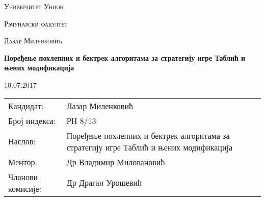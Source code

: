 \documentclass[a4paper, 12pt, ngerman]{article}
\newcommand{\DocumentTitle}{Поређење похлепних и бектрек алгоритама за стратегију игре Таблић и њених модификација}
\begin{document}
\renewcommand{\contentsname}{Садржај}
\renewcommand{\refname}{Литература}
\renewcommand{\abstractname}{Апстракт}
\renewcommand{\figurename}{Слика}
\renewcommand{\appendixtocname}{Додаци}
\renewcommand{\lstlistingname}{Фајл}
\renewcommand{\tablename}{Табела}
\renewcommand{\proofname}{Доказ}

\makeatletter
\renewcommand{\ALG@name}{Алгоритам}
\makeatother

\begin{titlepage}
	\centering
	{\scshape\Large Универзитет Унион \par}
	\vspace{1cm}
	{\scshape\LARGE Рачунарски факултет\par}
	\vspace{2cm}
	{\scshape\large Лазар Миленковић\par}
	\vspace{0.5cm}
	{\huge\bfseries \DocumentTitle \par}
	\vspace{2cm}
	\vfill

	
	{\large 10.07.2017\par}
\end{titlepage}
\pagebreak

\begin{tabularx}{\textwidth}{lX}
	Кандидат: & Лазар Миленковић  \\
	Број индекса: & РН 8/13 \\
	Наслов: & \DocumentTitle \\
	Ментор: & Др Владимир Миловановић\\
		Чланови комисије: & Др Драган Урошевић\\
\end{tabularx}
\pagebreak
\begin{abstract}
У овом раду пореде се временска, меморијска сложеност, као и ефикасност похлепне стратегије, као и неколико бектрек стратегија за игру Таблић и њених модификација. Таблић је популарна игра картама у којој сваки играч наизменично повлачи једну карту са циљем да на крају игре има највећи збир сакупљених карата. У стандардној верзији, играч зна само карте које му се тренутно налазе у руци као и све карте које су прошле до сада. За ову верзију игре имплементирана је похлепна стратегија по узору на стратегије које користе играчи. Модификована верзија подразумева да играч зна којом стратегијом играју његови противници, као и редослед карата до краја партије. За ову верзију су имплементиране бектрек методе које планирају неколико потеза унапред.
\end{abstract}
\end{document}
